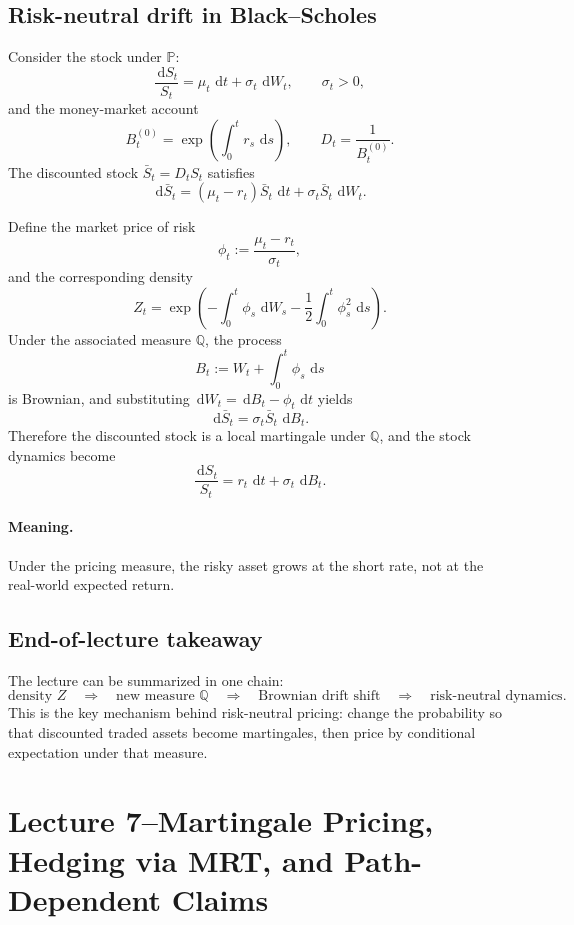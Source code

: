 \documentclass[11pt]{article}
\newcommand{\Pbb}{\mathbb{P}}
\newcommand{\Qbb}{\mathbb{Q}}
\newcommand{\dd}{\,\mathrm{d}}
\newcommand{\1}{\mathbf{1}}
\theoremstyle{plain}
\theoremstyle{definition}
\theoremstyle{remark}
\begin{document}
\subsection{Risk-neutral drift in Black--Scholes}

Consider the stock under $\Pbb$:
\[
\frac{\dd S_t}{S_t}=\mu_t\,\dd t+\sigma_t\,\dd W_t,
\qquad \sigma_t>0,
\]
and the money-market account
\[
B_t^{(0)}=\exp\!\left(\int_0^t r_s\,\dd s\right),
\qquad
D_t=\frac{1}{B_t^{(0)}}.
\]
The discounted stock $\bar S_t=D_tS_t$ satisfies
\[
\dd \bar S_t=(\mu_t-r_t)\bar S_t\,\dd t+\sigma_t\bar S_t\,\dd W_t.
\]

Define the market price of risk
\[
\phi_t:=\frac{\mu_t-r_t}{\sigma_t},
\]
and the corresponding density
\[
Z_t
=
\exp\!\left(
-\int_0^t \phi_s\,\dd W_s
-
\frac12\int_0^t \phi_s^2\,\dd s
\right).
\]
Under the associated measure $\Qbb$, the process
\[
B_t:=W_t+\int_0^t \phi_s\,\dd s
\]
is Brownian, and substituting $\dd W_t=\dd B_t-\phi_t\,\dd t$ yields
\[
\dd \bar S_t=\sigma_t\bar S_t\,\dd B_t.
\]
Therefore the discounted stock is a local martingale under $\Qbb$, and the stock dynamics become
\[
\boxed{
\;
\frac{\dd S_t}{S_t}=r_t\,\dd t+\sigma_t\,\dd B_t.
\;}
\]

\paragraph{Meaning.}
Under the pricing measure, the risky asset grows at the short rate, not at the real-world expected return.

\subsection{End-of-lecture takeaway}

The lecture can be summarized in one chain:
\[
\text{density } Z
\quad\Longrightarrow\quad
\text{new measure } \Qbb
\quad\Longrightarrow\quad
\text{Brownian drift shift}
\quad\Longrightarrow\quad
\text{risk-neutral dynamics}.
\]
This is the key mechanism behind risk-neutral pricing:
change the probability so that discounted traded assets become martingales, then price by conditional expectation under that measure.



\section{Lecture 7--Martingale Pricing, Hedging via MRT, and Path-Dependent Claims}
\end{document}
